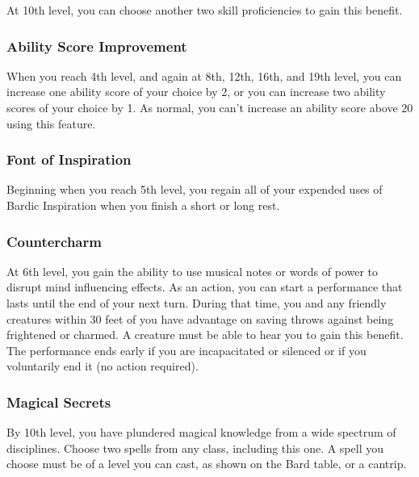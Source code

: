 \documentclass[
]{article}
\begin{document}
At 10th level, you can choose another two skill proficiencies to gain
this benefit.

\hypertarget{ability-score-improvement}{%
\subsubsection{Ability Score
Improvement}\label{ability-score-improvement}}

When you reach 4th level, and again at 8th, 12th, 16th, and 19th level,
you can increase one ability score of your choice by 2, or you can
increase two ability scores of your choice by 1. As normal, you can't
increase an ability score above 20 using this feature.

\hypertarget{font-of-inspiration}{%
\subsubsection{Font of Inspiration}\label{font-of-inspiration}}

Beginning when you reach 5th level, you regain all of your expended uses
of Bardic Inspiration when you finish a short or long rest.

\hypertarget{countercharm}{%
\subsubsection{Countercharm}\label{countercharm}}

At 6th level, you gain the ability to use musical notes or words of
power to disrupt mind influencing effects. As an action, you can start a
performance that lasts until the end of your next turn. During that
time, you and any friendly creatures within 30 feet of you have
advantage on saving throws against being frightened or charmed. A
creature must be able to hear you to gain this benefit. The performance
ends early if you are incapacitated or silenced or if you voluntarily
end it (no action required).

\hypertarget{magical-secrets}{%
\subsubsection{Magical Secrets}\label{magical-secrets}}

By 10th level, you have plundered magical knowledge from a wide spectrum
of disciplines. Choose two spells from any class, including this one. A
spell you choose must be of a level you can cast, as shown on the Bard
table, or a cantrip.
\end{document}
